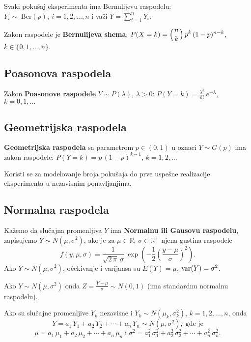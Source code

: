 \documentclass[twoside,titlepage,12pt,a4paper]{book}
\def\R{\mathbb{R}}
\def\var{\mathop{\rm var}\nolimits}
\numberwithin{equation}{chapter}
\begin{document}
Svaki pokušaj eksperimenta ima Bernulijevu raspodelu: $Y_i \sim \;\mbox{Ber} ( p ), \: i = 1, 2, \ldots, n$ i važi $Y = \sum_{i=1}^n Y_i$.

Zakon raspodele je \textbf{Bernulijeva shema}:
$\displaystyle P( X = k ) =
\left( \genfrac{}{}{0pt}{}{n}{k} \right) p^k \, (1 - p)^{n-k}$,
$\displaystyle k \in \{ 0, 1, \ldots, n \}$.

\subsection{Poasonova raspodela}

Zakon \textbf{Poasonove raspodele} $Y \sim P ( \lambda )$, $\lambda > 0$:
$\displaystyle P ( Y = k ) = \frac{\lambda^k}{k!} \, e^{-\lambda}$,
$\displaystyle k = 0, 1, \ldots$

\subsection{Geometrijska raspodela}

\textbf{Geometrijska raspodela} sa parametrom $p \in ( 0, 1 )$ 
u oznaci $Y \sim G ( p )$ ima zakon raspodele:
$\displaystyle P ( Y = k ) = p \, ( 1 - p )^{k-1}$,
$\displaystyle k = 1, 2, \ldots$ 

Koristi se za modelovanje broja pokušaja do prve uspešne realizacije eksperimenta u nezavisnim ponavljanjima.

\subsection{Normalna raspodela}

Kažemo da slučajna promenljiva $Y$ ima \textbf{Normalnu ili Gausovu
raspodelu}, zapisujemo  $Y \sim N ( \mu, \sigma^2 )$, ako je za $\mu \in \R$,
$\sigma \in \R^+$  njena gustina raspodele
\begin{equation}\label{eq:gauss}
f ( y, \mu, \sigma ) = \frac{1}{\sqrt{2 \, \pi } \: \sigma} \:
\exp \left( -\frac12 \left( \frac{y - \mu}{\sigma} \right)^2 \right).
\end{equation}
Ako $Y \sim N ( \mu, \sigma^2 )$, očekivanje i varijansa su
$E ( Y ) = \mu$, $\var ( Y ) = \sigma^2$.

Ako $Y \sim N ( \mu, \sigma^2 )$ onda 
$\displaystyle Z = \frac{Y - \mu}{\sigma} \sim N ( 0, 1 )$
(ima standardnu normalnu raspodelu).

Ako su slučajne promenljive $Y_k$ nezavisne i
$Y_k \sim N ( \mu_k, \sigma_k^2 )$, $k = 1, 2, \ldots, n$,
onda
$$Y = a_1 \, Y_1 + a_2 \, Y_2 + \cdots + a_n \, Y_n \sim N ( \mu, \sigma^2 ), \;\mbox{gde je}$$
$$\mu = a_1 \, \mu_1 + a_2 \, \mu_2 + \cdots + a_n \, \mu_n \;\mbox{i}\;
\sigma^2 = a_1^2 \, \sigma_1^2 + a_2^2 \, \sigma_2^2 +  \cdots + 
a_n^2 \, \sigma_n^2.$$
\end{document}
